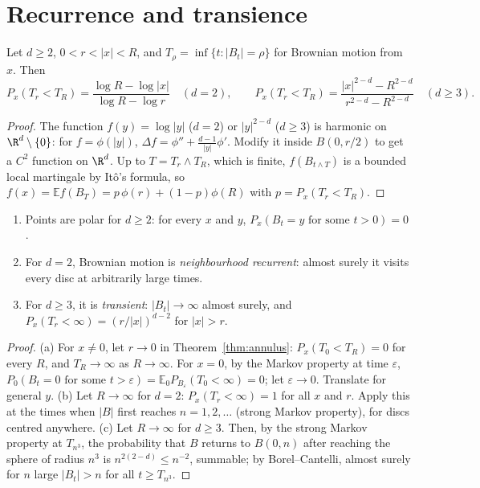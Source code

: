 \section{Recurrence and transience}

\begin{theorem}\label{thm:annulus}
Let $d\ge2$, $0<r<|x|<R$, and $T_\rho=\inf\{t:|B_t|=\rho\}$ for Brownian motion from $x$. Then
\[
P_x(T_r<T_R)=\frac{\log R-\log|x|}{\log R-\log r}\quad(d=2),\qquad P_x(T_r<T_R)=\frac{|x|^{2-d}-R^{2-d}}{r^{2-d}-R^{2-d}}\quad(d\ge3).
\]
\end{theorem}

\begin{proof}
The function $f(y)=\log|y|$ ($d=2$) or $|y|^{2-d}$ ($d\ge3$) is harmonic on $\R^d\setminus\{0\}$: for $f=\phi(|y|)$, $\Delta f=\phi''+\frac{d-1}{|y|}\phi'$. Modify it inside $B(0,r/2)$ to get a $C^2$ function on $\R^d$. Up to $T=T_r\wedge T_R$,
which is finite, $f(B_{t\wedge T})$ is a bounded local martingale by It\^o's formula, so $f(x)=\mathbb Ef(B_T)=p\,\phi(r)+(1-p)\phi(R)$ with $p=P_x(T_r<T_R)$.
\end{proof}

\begin{corollary}\label{cor:recurrence}
\begin{enumerate}[label=(\alph*)]
\item Points are polar for $d\ge2$: for every $x$ and $y$, $P_x(B_t=y\text{ for some }t>0)=0$.
\item For $d=2$, Brownian motion is \emph{neighbourhood recurrent}: almost surely it visits every disc at arbitrarily large times.
\item For $d\ge3$, it is \emph{transient}: $|B_t|\to\infty$ almost surely, and $P_x(T_r<\infty)=(r/|x|)^{d-2}$ for $|x|>r$.
\end{enumerate}
\end{corollary}

\begin{proof}
(a) For $x\ne0$, let $r\to0$ in Theorem~\ref{thm:annulus}: $P_x(T_0<T_R)=0$ for every $R$, and $T_R\to\infty$ as $R\to\infty$. For $x=0$, by the Markov property at time $\varepsilon$, $P_0(B_t=0\text{ for some }t>\varepsilon)=\mathbb E_0P_{B_\varepsilon}(T_0<\infty)=0$;
let $\varepsilon\to0$. Translate for general $y$. (b) Let $R\to\infty$ for $d=2$: $P_x(T_r<\infty)=1$ for all $x$ and $r$. Apply this at the times when $|B|$ first reaches $n=1,2,\dots$ (strong Markov property), for discs
centred anywhere. (c) Let $R\to\infty$ for $d\ge3$. Then, by the strong Markov property at $T_{n^3}$, the probability that $B$ returns to $B(0,n)$ after reaching the sphere of radius $n^3$ is $n^{2(2-d)}\le n^{-2}$, summable;
by Borel--Cantelli, almost surely for $n$ large $|B_t|>n$ for all $t\ge T_{n^3}$.
\end{proof}

